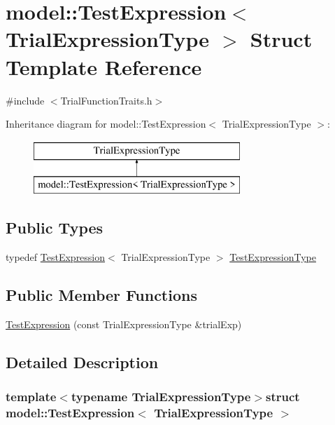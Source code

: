 \hypertarget{structmodel_1_1_test_expression}{}\section{model\+:\+:Test\+Expression$<$ Trial\+Expression\+Type $>$ Struct Template Reference}
\label{structmodel_1_1_test_expression}


{\ttfamily \#include $<$Trial\+Function\+Traits.\+h$>$}

Inheritance diagram for model\+:\+:Test\+Expression$<$ Trial\+Expression\+Type $>$\+:\begin{figure}[H]
\begin{center}
\leavevmode
\includegraphics[height=2.000000cm]{structmodel_1_1_test_expression}
\end{center}
\end{figure}
\subsection*{Public Types}
\begin{DoxyCompactItemize}
\item 
typedef \hyperlink{structmodel_1_1_test_expression}{Test\+Expression}$<$ Trial\+Expression\+Type $>$ \hyperlink{structmodel_1_1_test_expression_a6fc191efdbf3ba4e1658140039293a11}{Test\+Expression\+Type}
\end{DoxyCompactItemize}
\subsection*{Public Member Functions}
\begin{DoxyCompactItemize}
\item 
\hyperlink{structmodel_1_1_test_expression_a62f52c25f5f94446fdc68619a492612a}{Test\+Expression} (const Trial\+Expression\+Type \&trial\+Exp)
\end{DoxyCompactItemize}


\subsection{Detailed Description}
\subsubsection*{template$<$typename Trial\+Expression\+Type$>$struct model\+::\+Test\+Expression$<$ Trial\+Expression\+Type $>$}



